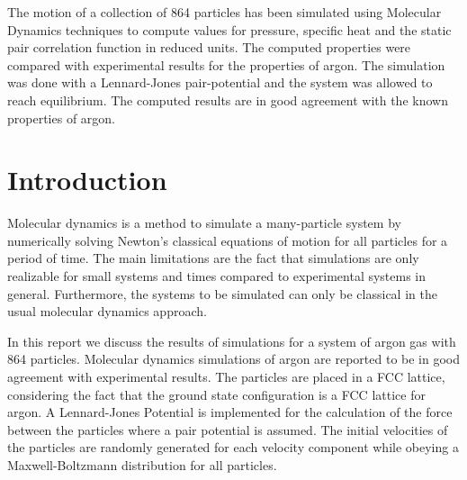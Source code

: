 \documentclass[
10pt, %
a4paper, %
oneside, %
headinclude,footinclude, %
BCOR5mm, %
]{scrartcl}
\begin{document}
The motion of a collection of 864 particles has been simulated using Molecular Dynamics techniques to compute values for pressure, specific heat and the static pair correlation function in reduced units. The computed properties were compared with experimental results for the properties of argon. The simulation was done with a Lennard-Jones pair-potential and the system was allowed to reach equilibrium. The computed results are in good agreement with the known properties of argon.






\newpage %


\section{Introduction}

Molecular dynamics is a method to simulate a many-particle system by numerically solving Newton's classical equations of motion for all particles for a period of time. The main limitations are the fact that simulations are only  realizable for small systems  and times compared to experimental systems in general. Furthermore, the systems to be simulated can only be classical in the usual molecular dynamics approach. 

In this report we discuss the results of simulations for a system of argon gas with 864 particles. Molecular dynamics simulations of argon are reported to be in good agreement with experimental results\cite{Verlet:1967md}. The particles are placed in a FCC lattice, considering the fact that the ground state configuration is a FCC lattice for argon. A Lennard-Jones Potential is implemented for the calculation of the force between the particles where a pair potential is assumed. The initial velocities of the particles are randomly generated for each velocity component while obeying a Maxwell-Boltzmann distribution for all particles. 
\end{document}
